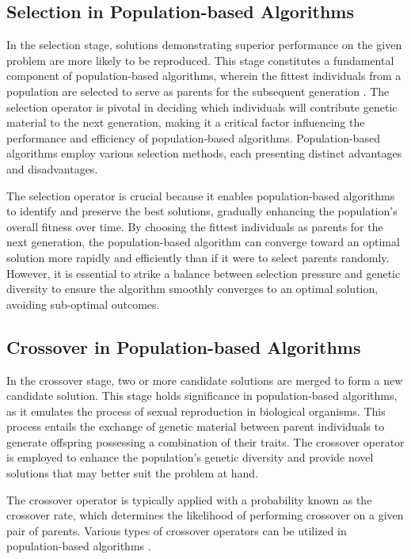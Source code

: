 \documentclass[runningheads]{llncs}
\begin{document}
\subsection{Selection in Population-based Algorithms}

In the selection stage, solutions demonstrating superior performance on the given problem are more likely to be reproduced. This stage constitutes a fundamental component of population-based algorithms, wherein the fittest individuals from a population are selected to serve as parents for the subsequent generation \cite{Miller-1996}. The selection operator is pivotal in deciding which individuals will contribute genetic material to the next generation, making it a critical factor influencing the performance and efficiency of population-based algorithms. Population-based algorithms employ various selection methods, each presenting distinct advantages and disadvantages.

The selection operator is crucial because it enables population-based algorithms to identify and preserve the best solutions, gradually enhancing the population's overall fitness over time. By choosing the fittest individuals as parents for the next generation, the population-based algorithm can converge toward an optimal solution more rapidly and efficiently than if it were to select parents randomly. However, it is essential to strike a balance between selection pressure and genetic diversity to ensure the algorithm smoothly converges to an optimal solution, avoiding sub-optimal outcomes.

\subsection{Crossover in Population-based Algorithms}

In the crossover stage, two or more candidate solutions are merged to form a new candidate solution. This stage holds significance in population-based algorithms, as it emulates the process of sexual reproduction in biological organisms. This process entails the exchange of genetic material between parent individuals to generate offspring possessing a combination of their traits. The crossover operator is employed to enhance the population's genetic diversity and provide novel solutions that may better suit the problem at hand.

The crossover operator is typically applied with a probability known as the crossover rate, which determines the likelihood of performing crossover on a given pair of parents. Various types of crossover operators can be utilized in population-based algorithms \cite{Umbarkar-2015}.
\end{document}
